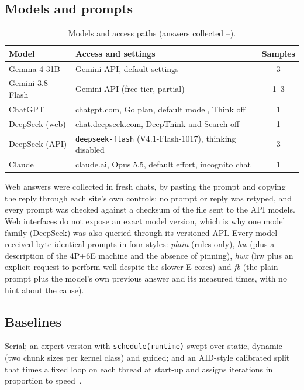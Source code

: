 \documentclass[conference]{IEEEtran}
\begin{document}
\subsection{Models and prompts}
\begin{table}[t]\centering\caption{Models and access paths (answers collected \NumCollectFrom--\NumCollectTo).}\label{tab:models}
\footnotesize\setlength{\tabcolsep}{3pt}\begin{tabular}{@{}lp{5.0cm}c@{}}\toprule
Model & Access and settings & Samples \\\midrule
Gemma 4 31B & Gemini API, default settings & 3 \\
Gemini 3.8 Flash & Gemini API (free tier, partial) & 1--3 \\
ChatGPT & chatgpt.com, Go plan, default model, Think off & 1 \\
DeepSeek (web) & chat.deepseek.com, DeepThink and Search off & 1 \\
DeepSeek (API) & \texttt{deepseek-flash} (V4.1-Flash-1017), thinking disabled & 3 \\
Claude & claude.ai, Opus 5.5, default effort, incognito chat & 1 \\\bottomrule
\end{tabular}\end{table}
Web answers were collected in fresh chats, by pasting the prompt and copying the reply through each site's own controls; no prompt or reply was retyped, and every prompt was checked against a checksum of the file sent to the API models. Web interfaces do not expose an exact model version, which is why one model family (DeepSeek) was also queried through its versioned API.
Every model received byte-identical prompts in four styles: \emph{plain} (rules only), \emph{hw} (plus a description of the 4P+6E machine and the absence of pinning), \emph{hwx} (hw plus an explicit request to perform well despite the slower E-cores) and \emph{fb} (the plain prompt plus the model's own previous answer and its measured times, with no hint about the cause).

\subsection{Baselines}
Serial; an expert version with \texttt{schedule(runtime)} swept over static, dynamic (two chunk sizes per kernel class) and guided; and an AID-style calibrated split that times a fixed loop on each thread at start-up and assigns iterations in proportion to speed~\cite{saez2020aid,beserra2026amp}.
\end{document}
